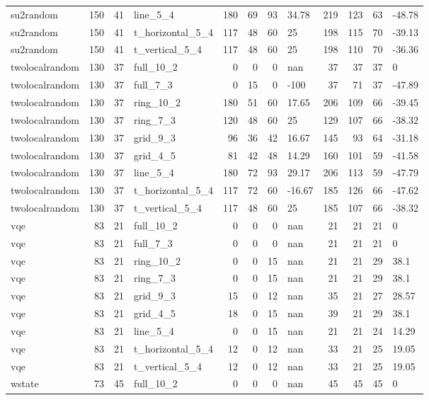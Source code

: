\begin{longtable}{lrrlrrrlrrrl}
su2random & 150 & 41 & line\_5\_4 & 180 & 69 & 93 & 34.78 & 219 & 123 & 63 & -48.78 \\
su2random & 150 & 41 & t\_horizontal\_5\_4 & 117 & 48 & 60 & 25 & 198 & 115 & 70 & -39.13 \\
su2random & 150 & 41 & t\_vertical\_5\_4 & 117 & 48 & 60 & 25 & 198 & 110 & 70 & -36.36 \\
twolocalrandom & 130 & 37 & full\_10\_2 & 0 & 0 & 0 & nan & 37 & 37 & 37 & 0 \\
twolocalrandom & 130 & 37 & full\_7\_3 & 0 & 15 & 0 & -100 & 37 & 71 & 37 & -47.89 \\
twolocalrandom & 130 & 37 & ring\_10\_2 & 180 & 51 & 60 & 17.65 & 206 & 109 & 66 & -39.45 \\
twolocalrandom & 130 & 37 & ring\_7\_3 & 120 & 48 & 60 & 25 & 129 & 107 & 66 & -38.32 \\
twolocalrandom & 130 & 37 & grid\_9\_3 & 96 & 36 & 42 & 16.67 & 145 & 93 & 64 & -31.18 \\
twolocalrandom & 130 & 37 & grid\_4\_5 & 81 & 42 & 48 & 14.29 & 160 & 101 & 59 & -41.58 \\
twolocalrandom & 130 & 37 & line\_5\_4 & 180 & 72 & 93 & 29.17 & 206 & 113 & 59 & -47.79 \\
twolocalrandom & 130 & 37 & t\_horizontal\_5\_4 & 117 & 72 & 60 & -16.67 & 185 & 126 & 66 & -47.62 \\
twolocalrandom & 130 & 37 & t\_vertical\_5\_4 & 117 & 48 & 60 & 25 & 185 & 107 & 66 & -38.32 \\
vqe & 83 & 21 & full\_10\_2 & 0 & 0 & 0 & nan & 21 & 21 & 21 & 0 \\
vqe & 83 & 21 & full\_7\_3 & 0 & 0 & 0 & nan & 21 & 21 & 21 & 0 \\
vqe & 83 & 21 & ring\_10\_2 & 0 & 0 & 15 & nan & 21 & 21 & 29 & 38.1 \\
vqe & 83 & 21 & ring\_7\_3 & 0 & 0 & 15 & nan & 21 & 21 & 29 & 38.1 \\
vqe & 83 & 21 & grid\_9\_3 & 15 & 0 & 12 & nan & 35 & 21 & 27 & 28.57 \\
vqe & 83 & 21 & grid\_4\_5 & 18 & 0 & 15 & nan & 39 & 21 & 29 & 38.1 \\
vqe & 83 & 21 & line\_5\_4 & 0 & 0 & 15 & nan & 21 & 21 & 24 & 14.29 \\
vqe & 83 & 21 & t\_horizontal\_5\_4 & 12 & 0 & 12 & nan & 33 & 21 & 25 & 19.05 \\
vqe & 83 & 21 & t\_vertical\_5\_4 & 12 & 0 & 12 & nan & 33 & 21 & 25 & 19.05 \\
wstate & 73 & 45 & full\_10\_2 & 0 & 0 & 0 & nan & 45 & 45 & 45 & 0 \\

\end{longtable}
